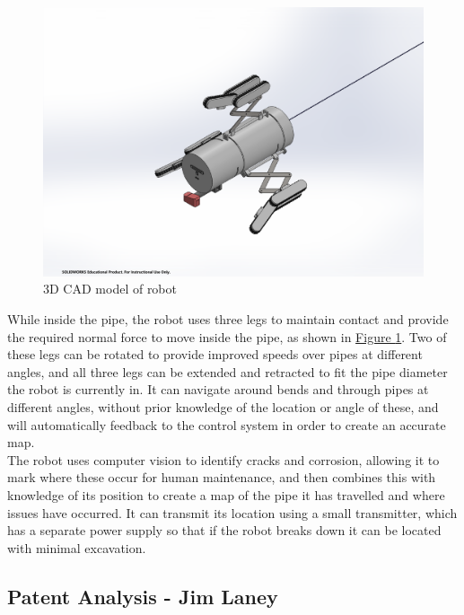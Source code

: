 \documentclass[11pt]{article}		%
\newlength{\imageheight}	 %
\begin{document}
		\begin{figure}[h] %
			\centering
			\includegraphics[trim={6cm 2cm 7cm 4cm},clip,height=\imageheight]{overviewCAD}
			\caption{3D CAD model of robot}
			\label{3DSketch}
		\end{figure}
		
		While inside the pipe, the robot uses three legs to maintain contact and provide the required normal force to move inside the pipe, as shown in \hyperref[3DSketch]{Figure \ref*{3DSketch}}.
		Two of these legs can be rotated to provide improved speeds over pipes at different angles, and all three legs can be extended and retracted to fit the pipe diameter the robot is currently in.
		It can navigate around bends and through pipes at different angles, without prior knowledge of the location or angle of these, and will automatically feedback to the control system in order to create an accurate map.
		\\
		The robot uses computer vision to identify cracks and corrosion, allowing it to mark where these occur for human maintenance, and then combines this with knowledge of its position to create a map of the pipe it has travelled and where issues have occurred.
		It can transmit its location using a small transmitter, which has a separate power supply so that if the robot breaks down it can be located with minimal excavation.
	
	\subsection[Patent Analysis]{Patent Analysis - Jim Laney}
\end{document}
